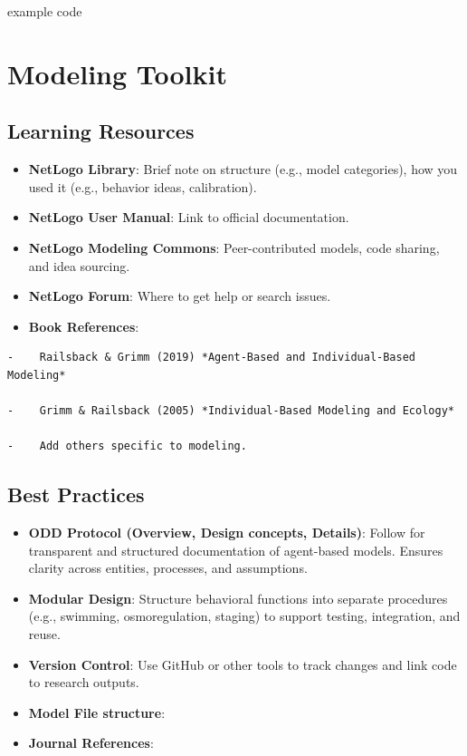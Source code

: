 \documentclass[
]{book}
\providecommand{\tightlist}{%
  \setlength{\itemsep}{0pt}\setlength{\parskip}{0pt}}
\begin{document}
example code

\chapter{Modeling Toolkit}\label{modeling-toolkit}

\section{Learning Resources}\label{learning-resources}

\begin{itemize}
\tightlist
\item
  \textbf{NetLogo Library}: Brief note on structure (e.g., model categories), how you used it (e.g., behavior ideas, calibration).
\item
  \textbf{NetLogo User Manual}: Link to official documentation.
\item
  \textbf{NetLogo Modeling Commons}: Peer-contributed models, code sharing, and idea sourcing.
\item
  \textbf{NetLogo Forum}: Where to get help or search issues.
\item
  \textbf{Book References}:
\end{itemize}

\begin{verbatim}
-    Railsback & Grimm (2019) *Agent-Based and Individual-Based Modeling*

-    Grimm & Railsback (2005) *Individual-Based Modeling and Ecology*

-    Add others specific to modeling.
\end{verbatim}

\section{Best Practices}\label{best-practices}

\begin{itemize}
\item
  \textbf{ODD Protocol (Overview, Design concepts, Details)}: Follow for transparent and structured documentation of agent-based models. Ensures clarity across entities, processes, and assumptions.
\item
  \textbf{Modular Design}: Structure behavioral functions into separate procedures (e.g., swimming, osmoregulation, staging) to support testing, integration, and reuse.
\item
  \textbf{Version Control}: Use GitHub or other tools to track changes and link code to research outputs.
\item
  \textbf{Model File structure}:
\item
  \textbf{Journal References}:
\end{itemize}
\end{document}
